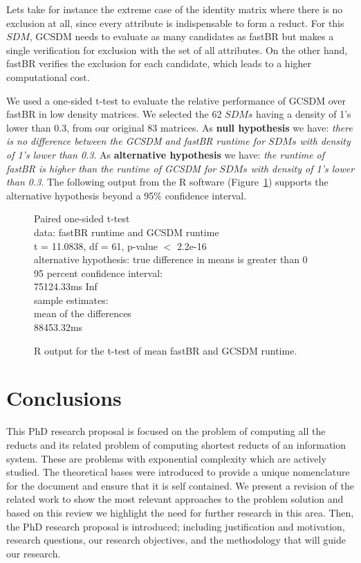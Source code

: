 \documentclass[authoryear,11pt]{elsarticle}
\begin{document}
	Lets take for instance the extreme case of the identity matrix where there is no exclusion at all,
	since every attribute is indispensable to form a reduct. 	For this $SDM$, GCSDM needs to evaluate as 
	many candidates as fastBR but makes a single verification for exclusion with the set of all attributes. 
	On the other hand, fastBR verifies the exclusion for each candidate, which leads to a higher 
	computational cost.
	
	We used a one-sided t-test to evaluate the relative performance of GCSDM over fastBR in
	low density matrices. We selected the 62 $SDMs$ having a density 	of 1's lower than 0.3, from our original 
	83 matrices. As \textbf{null hypothesis} we have: \emph{there is no difference between the GCSDM and fastBR 
	runtime for $SDMs$ with density of 1's lower than 0.3}. As \textbf{alternative hypothesis} we have: 
	\emph{the runtime of fastBR is higher than the runtime of GCSDM for $SDMs$ with density of 1's lower than 
	0.3}. The following output from the R software (Figure~\ref{fig:R_fastBRvsGCSDM}) supports the alternative
	hypothesis beyond a 95\% confidence interval.
	
	\begin{figure}
		\qquad{}	Paired one-sided t-test\\

		data:  fastBR runtime and GCSDM runtime\\
		t = 11.0838, df = 61, p-value $<$ 2.2e-16\\
		alternative hypothesis: true difference in means is greater than 0\\
		95 percent confidence interval:\\
		 75124.33ms  \qquad{}  Inf\\
		sample estimates:\\
		mean of the differences \\
		 \qquad{}    88453.32ms
		 		 
		\centering
	  	\caption{R output for the t-test of mean fastBR and GCSDM runtime.}
	  	\label{fig:R_fastBRvsGCSDM}
	\end{figure}
	
\newpage 
\section{Conclusions}
	This PhD research proposal is focused on the problem of computing all the reducts and its related problem of
	computing shortest reducts of an information system. These are problems with exponential complexity which are
	actively studied. The theoretical bases were introduced to provide a unique nomenclature for the document and
	ensure that it is self contained. We present a revision of the related work to show the most relevant 
	approaches to the problem solution and based on this review we highlight the need for further research in this
	area. Then, the PhD research proposal is introduced; including justification and motivation, research 
	questions, our research objectives, and the methodology that will guide our research.
	
\end{document}
